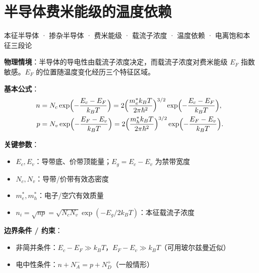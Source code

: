 
\section{半导体费米能级的温度依赖}
\label{sec:semiconductor-fermi}

\begin{tipbox}[关键词标签]
本征半导体 · 掺杂半导体 · 费米能级 · 载流子浓度 · 温度依赖 · 电离饱和本征三段论
\end{tipbox}

\begin{modelbox}[模型：半导体费米能级]
\textbf{物理情境}：半导体的导电性由载流子浓度决定，而载流子浓度对费米能级 $E_F$ 指数敏感。$E_F$ 的位置随温度变化经历三个特征区域。

\textbf{基本公式}：
\begin{align*}
n &= N_c\exp\Bigl(-\frac{E_c-E_F}{k_BT}\Bigr)=2\Bigl(\frac{m_e^*k_BT}{2\pi\hbar^2}\Bigr)^{3/2}\exp\Bigl(-\frac{E_c-E_F}{k_BT}\Bigr),\\
p &= N_v\exp\Bigl(-\frac{E_F-E_v}{k_BT}\Bigr)=2\Bigl(\frac{m_h^*k_BT}{2\pi\hbar^2}\Bigr)^{3/2}\exp\Bigl(-\frac{E_F-E_v}{k_BT}\Bigr).
\end{align*}

\textbf{关键参数}：
\begin{itemize}[nosep]
    \item $E_c, E_v$：导带底、价带顶能量；$E_g=E_c-E_v$ 为禁带宽度
    \item $N_c, N_v$：导带/价带有效态密度
    \item $m_e^*, m_h^*$：电子/空穴有效质量
    \item $n_i=\sqrt{np}=\sqrt{N_cN_v}\exp(-E_g/2k_BT)$：本征载流子浓度
\end{itemize}

\textbf{边界条件 / 约束}：
\begin{itemize}[nosep]
    \item 非简并条件：$E_c-E_F\gg k_BT$，$E_F-E_v\gg k_BT$（可用玻尔兹曼近似）
    \item 电中性条件：$n+N_A^-=p+N_D^+$（一般情形）
\end{itemize}
\end{modelbox}

